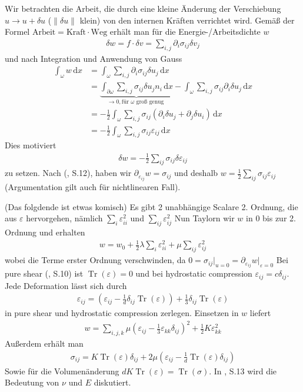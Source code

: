 \documentclass{scrartcl}
\def\e{\varepsilon}
\newcommand{\dif}[1]{\,\mathrm{d} #1}
\newcommand{\norm}[1]{\lVert #1 \rVert}
\DeclareMathOperator{\Tr}{Tr}       	  %
\begin{document}
Wir betrachten die Arbeit, die durch eine kleine Änderung der Verschiebung $u\to u+\delta u$ ($\norm{\delta u}$ klein) von den internen Kräften verrichtet wird. Gemäß der Formel $\text{Arbeit}=\text{Kraft}\cdot\text{Weg}$ erhält man für die Energie-/Arbeitsdichte $w$
\begin{align*}
	\delta w = f\cdot \delta v
	= \sum_{i,j} \partial_i\sigma_{ij}\delta v_j
\end{align*}
und nach Integration und Anwendung von Gauss
\begin{align*}
	\int_\omega w\dif x
	&= \int_\omega\sum_{i,j} \partial_i\sigma_{ij}\delta u_j\dif x \\
	&= \underbrace{\int_{\partial\omega}\sum_{i,j} \sigma_{ij}\delta u_jn_i\dif x}_{\to0, \text{für }\omega\text{ groß genug }}-\int_\omega\sum_{i,j} \sigma_{ij}\partial_i\delta u_j\dif x \\
	&= -\frac{1}{2}\int_\omega\sum_{i,j}\sigma_{ij}\left(\partial_i\delta u_j+\partial_j\delta u_i\right)\dif x \\
	&= -\frac{1}{2}\int_\omega\sum_{i,j}\sigma_{ij}\e_{ij}\dif x
\end{align*}
Dies motiviert
\begin{align*}
	\delta w=-\frac{1}{2}\sum_{ij}\sigma_{ij}\delta \e_{ij}
\end{align*}
zu setzen. Nach (\cite{Lif-1959}, S.12), haben wir $\partial_{\e_{ij}}w =\sigma_{ij}$ und deshalb $w=\frac{1}{2}\sum_{ij}\sigma_{ij}\e_{ij}$ (Argumentation gilt auch für nichtlinearen Fall).


(Das folgdende ist etwas komisch) Es gibt 2 unabhängige Scalare 2. Ordnung, die aus $\e$ hervorgehen, nämlich $\sum_i\e_{ii}^2$ und $\sum_{ij}\e_{ij}^2$
Nun Taylorn wir $w$ in $0$ bis zur 2. Ordnung und erhalten
\begin{align*}
	w=w_0+\frac{1}{2}\lambda\sum_i\e_{ii}^2+\mu\sum_{ij}\e_{ij}^2
\end{align*}
wobei die Terme erster Ordnung verschwinden, da $0=\sigma_{ij}|_{u=0}=\partial_{\e_{ij}}w\vert_{\e=0}$
Bei pure shear (\cite{Lif-1959}, S.10) ist $\Tr(\e)=0$ und bei hydrostatic compression $\e_{ij}=c\delta_{ij}$. Jede Deformation lässt sich durch
\begin{align*}
	\e_{ij}=(\e_{ij}-\frac{1}{d}\delta_{ij}\Tr(\e))+\frac{1}{3}\delta_{ij}\Tr(\e)
\end{align*}
in pure shear und hydrostatic compression zerlegen. Einsetzen in $w$ liefert
\begin{align*}
	w = \sum_{i,j,k}\mu(\e_{ij}-\frac{1}{3}\e_{kk}\delta_{ij})^2+\frac{1}{2}K\e_{kk}^2
\end{align*}
Außerdem erhält man
\begin{align*}
	\sigma_{ij}=K\Tr(\e)\delta_{ij}+2\mu(\e_{ij}-\frac{1}{d}\Tr(\e)\delta_{ij})
\end{align*}
Sowie für die Volumenänderung $dK\Tr(\e)=\Tr(\sigma)$. In \cite{Lif-1959}, S.13 wird die Bedeutung von $\nu$ und $E$ diskutiert.
\end{document}
